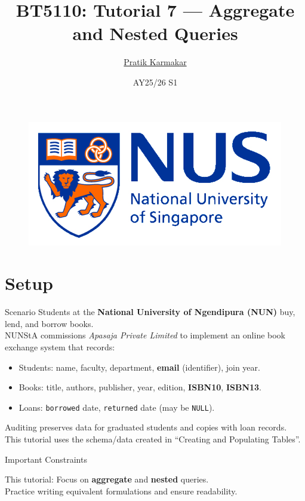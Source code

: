 \documentclass{beamer}
\author{\href{https://pratik2358.github.io/}{Pratik Karmakar}}
\title{BT5110: Tutorial 7 — Aggregate and Nested Queries}
\institute{
  School of Computing,\\
  National University of Singapore
}
\date{AY25/26 S1}
\begin{document}
\begin{frame}
  \titlepage
  \begin{figure}[htpb]
    \begin{center}
      \includegraphics[keepaspectratio, scale=0.18]{nus-logo.png}
    \end{center}
  \end{figure}
\end{frame}

\section{Setup}
\begin{frame}{Scenario}
\small
Students at the \textbf{National University of Ngendipura (NUN)} buy, lend, and borrow books.\\
NUNStA commissions \emph{Apasaja Private Limited} to implement an online book exchange system that records:
\begin{itemize}\itemsep3pt
  \item Students: name, faculty, department, \textbf{email} (identifier), join year.
  \item Books: title, authors, publisher, year, edition, \textbf{ISBN10}, \textbf{ISBN13}.
  \item Loans: \texttt{borrowed} date, \texttt{returned} date (may be \texttt{NULL}).
\end{itemize}
Auditing preserves data for graduated students and copies with loan records. \\
This tutorial uses the schema/data created in “Creating and Populating Tables”.
\end{frame}

\begin{frame}{Important Constraints}
\Large
\begin{block}{This tutorial:}
Focus on \textbf{aggregate} and \textbf{nested} queries.\\
Practice writing equivalent formulations and ensure readability.
\end{block}
\end{frame}
\end{document}
